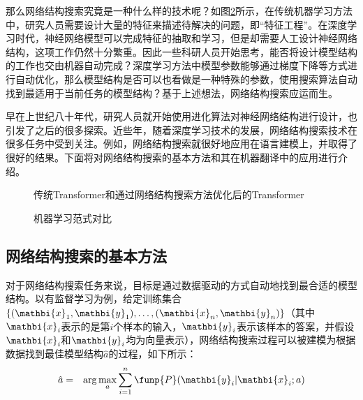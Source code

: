 \parinterval 那么网络结构搜索究竟是一种什么样的技术呢？如图\ref{fig:15-28}所示，在传统机器学习方法中，研究人员需要设计大量的特征来描述待解决的问题，即“特征工程”。在深度学习时代，神经网络模型可以完成特征的抽取和学习，但是却需要人工设计神经网络结构，这项工作仍然十分繁重。因此一些科研人员开始思考，能否将设计模型结构的工作也交由机器自动完成？深度学习方法中模型参数能够通过梯度下降等方式进行自动优化，那么模型结构是否可以也看做是一种特殊的参数，使用搜索算法自动找到最适用于当前任务的模型结构？基于上述想法，网络结构搜索应运而生。

\parinterval 早在上世纪八十年代，研究人员就开始使用进化算法对神经网络结构进行设计，也引发了之后的很多探索。近些年，随着深度学习技术的发展，网络结构搜索技术在很多任务中受到关注。例如，网络结构搜索就很好地应用在语言建模上，并取得了很好的结果。下面将对网络结构搜索的基本方法和其在机器翻译中的应用进行介绍。

\begin{figure}[htp]
\centering

\caption{传统Transformer和通过网络结构搜索方法优化后的Transformer}
\label{fig:15-27}
\end{figure}

\begin{figure}[htp]
\centering

\caption{机器学习范式对比}
\label{fig:15-28}
\end{figure}


\subsection{网络结构搜索的基本方法}

\parinterval 对于网络结构搜索任务来说，目标是通过数据驱动的方式自动地找到最合适的模型结构。以有监督学习为例，给定训练集合$\{(\mathbi{x}_{1},\mathbi{y}_{1}),\ldots,(\mathbi{x}_{n},\mathbi{y}_{n})\}$（其中$\mathbi{x}_{i}$表示的是第$i$个样本的输入，$\mathbi{y}_{i}$表示该样本的答案，并假设$\mathbi{x}_{i}$和$\mathbi{y}_{i}$均为向量表示），网络结构搜索过程可以被建模为根据数据找到最佳模型结构$\hat{a}$的过程，如下所示：
\begin{eqnarray}
\hat{a} &=& \arg\max_{a}\sum_{i=1}^{n}{\funp{P}(\mathbi{y}_{i}|\mathbi{x}_{i};a)}
\label{eq:15-57}
\end{eqnarray}

